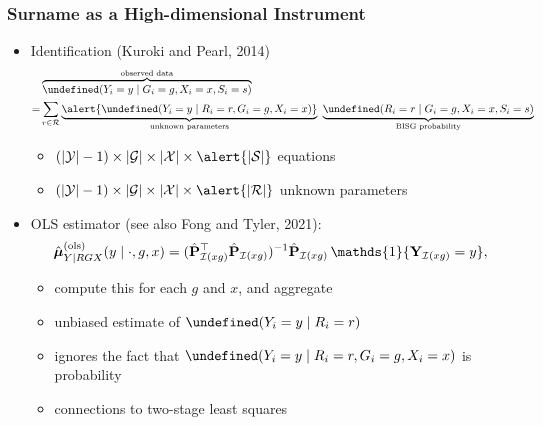 \documentclass{beamer}
\let\Pr\undefined
\DeclareMathOperator{\Pr}{\mathbb{P}}
\newcommand{\ind}{\mathds{1}}
\newcommand{\cI}{\mathcal{I}}
\begin{document}
\begin{frame}

  \frametitle{Surname as a High-dimensional Instrument}

  \begin{itemize}
  \item Identification {\scriptsize (Kuroki and Pearl, 2014)}
    {\small\begin{align*}
     & \overbrace{\Pr(Y_i=y\mid G_i=g, X_i=x, S_i=s)}^{\text{observed data}} \\
    = & \sum_{r\in\mathcal{R}} \underbrace{\alert{\Pr(Y_i=y\mid R_i=r, G_i=g,
        X_i=x)}}_{\text{unknown parameters}}\ \underbrace{\Pr(R_i=r\mid
        G_i=g, X_i=x, S_i=s)}_{\text{BISG probability}}
           \end{align*}}
    \vspace{-.2in}
         \begin{itemize}
         \item $(|\mathcal{Y}|-1)\times|\mathcal{G}|\times|\mathcal{X}|\times\alert{|\mathcal{S}|}$ equations
         \item
           $(|\mathcal{Y}|-1)\times|\mathcal{G}|\times|\mathcal{X}|\times\alert{|\mathcal{R}|}$
           unknown parameters
         \end{itemize}
         \vfill
       \item OLS estimator {\scriptsize (see also Fong and Tyler, 2021)}:
         $$
    \hat{\vb*\mu}^{(\text{ols})}_{Y\mid RGX}(y\mid \cdot, g,x) 
    =  (\hat{\vb P}_{\cI(xg)}^\top \hat{\vb P}_{\cI(xg)})^{-1}\hat{\vb P}_{\cI(xg)}\,\ind\{{\vb Y}_{\cI(xg)} = y\},
    $$
    \vspace{-.2in}
    \begin{itemize}
    \item compute this for each $g$ and $x$, and aggregate
    \item unbiased estimate of $\Pr(Y_i= y \mid R_i = r)$
    \item ignores the fact that $\Pr(Y_i= y \mid R_i = r, G_i
      = g, X_i = x)$ is probability
    \item connections to two-stage least squares
  \end{itemize}
  \end{itemize}

\end{frame}
\end{document}
